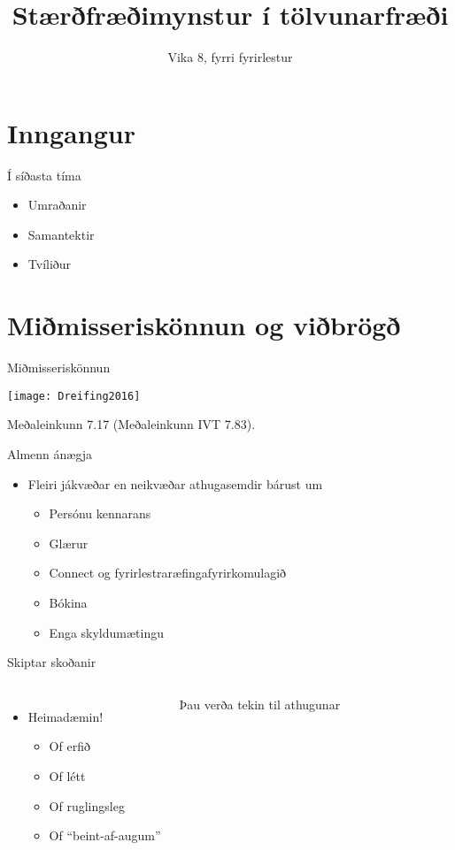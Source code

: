 \documentclass[handout]{beamer}
\title{Stærðfræðimynstur í tölvunarfræði}
\subtitle{Vika 8, fyrri fyrirlestur}
\begin{document}
\begin{frame}
\titlepage
\end{frame}


\section{Inngangur}

\begin{frame}{Í síðasta tíma}
\begin{itemize}
 \item Umraðanir
 \item Samantektir
 \item Tvíliður
\end{itemize}
\end{frame}

\section{Miðmisseriskönnun og viðbrögð}

\begin{frame}{Miðmisseriskönnun}
\begin{center}
\texttt{[image: Dreifing2016]}
\end{center}
Meðaleinkunn 7.17 (Meðaleinkunn IVT 7.83).
\end{frame}

\begin{frame}{Almenn ánægja}
\begin{itemize}
 \item Fleiri jákvæðar en neikvæðar athugasemdir bárust um
 \begin{itemize}[<+->]
  \item Persónu kennarans
  \item Glærur
  \item Connect og fyrirlestraræfingafyrirkomulagið
  \item Bókina
  \item Enga skyldumætingu
 \end{itemize}
\end{itemize}
\end{frame}

\begin{frame}{Skiptar skoðanir}
\begin{columns}
\begin{itemize}
 \item Heimadæmin!
 \begin{itemize}[<+->]
  \item Of erfið
  \item Of létt
  \item Of ruglingsleg
  \item Of ``beint-af-augum''
 \end{itemize}
\end{itemize}
Þau verða tekin til athugunar
\end{columns}
\end{frame}
\end{document}
